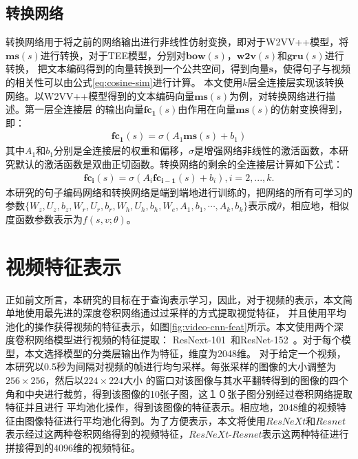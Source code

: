 \subsection{转换网络}
转换网络用于将之前的网络输出进行非线性仿射变换，即对于W2VV++模型，将$\bm{\mathbf{ms}}(s)$进行转换，对于TEE模型，分别对$\bm{\mathbf{bow}}(s)$，$\bm{\mathbf{w2v}}(s)$和$\bm{\mathbf{gru}}(s)$进行转换，
把文本编码得到的向量转换到一个公共空间，得到向量$\bm{\mathbf{s}}$，使得句子与视频的相关性可以由公式\ref{eq:cosine-sim}进行计算。
本文使用$k$层全连接层实现该转换网络。以W2VV++模型得到的文本编码向量$\bm{\mathbf{ms}}(s)$为例，对转换网络进行描述。第一层全连接层
的输出向量$\bm{\mathbf{fc_1}}(s)$由作用在向量$\bm{\mathbf{ms}}(s)$的仿射变换得到，即：
\begin{equation}
    \label{eq:fc-1}
    \begin{aligned}
        \bm{\mathbf{fc_1}}(s) = \sigma(A_1\bm{\mathbf{ms}}(s) + b_1)
    \end{aligned}
\end{equation}
其中$A_1$和$b_1$分别是全连接层的权重和偏移，$\sigma$是增强网络非线性的激活函数，本研究默认的激活函数是双曲正切函数。转换网络的剩余的全连接层计算如下公式：
\begin{equation}
    \label{eq:fc-k}
    \begin{aligned}
        \bm{\mathbf{fc_i}}(s) = \sigma(A_i\bm{\mathbf{fc_{i-1}}}(s) + b_i), i=2,...,k.
    \end{aligned}
\end{equation}
本研究的句子编码网络和转换网络是端到端地进行训练的，把网络的所有可学习的参数$\{W_z,U_z,b_z,W_r,U_r,b_r,W_h,U_h,b_h,W_e,A_1,b_1,\cdots,A_k,b_k\}$表示成$\theta$，相应地，相似度函数参数表示为$f(s,v;\theta)$。


\section{视频特征表示}
正如前文所言，本研究的目标在于查询表示学习，因此，对于视频的表示，本文简单地使用最先进的深度卷积网络通过过采样的方式提取视觉特征，
并且使用平均池化的操作获得视频的特征表示，如图\ref{fig:video-cnn-feat}所示。本文使用两个深度卷积网络模型进行视频的特征提取：
ResNext-101~\cite{}和ResNet-152~\cite{}。对于每个模型，本文选择模型的分类层输出作为特征，维度为2048维。
对于给定一个视频，本研究以0.5秒为间隔对视频的帧进行均匀采样。每张采样的图像的大小调整为$256\times256$，然后以$224\times224$大小
的窗口对该图像与其水平翻转得到的图像的四个角和中央进行裁剪，得到该图像的10张子图，这１０张子图分别经过卷积网络提取特征并且进行
平均池化操作，得到该图像的特征表示。相应地，2048维的视频特征由图像特征进行平均池化得到。为了方便表示，本文将使用$ResNeXt$和$Resnet$
表示经过这两种卷积网络得到的视频特征，$ResNeXt$-$Resnet$表示这两种特征进行拼接得到的4096维的视频特征。

